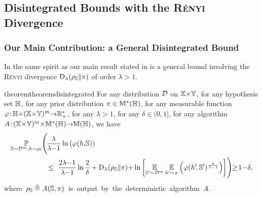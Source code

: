 \subsection{Disintegrated Bounds with the \textsc{Rényi} Divergence}

\subsubsection{Our Main Contribution: a General Disintegrated Bound}

In the same spirit as  our main result stated in  is a general bound involving the \textsc{Rényi} divergence $\operatorname{D}_{\lambda}(\rho_{\mathbb{S}}\|\pi)$ of order \mbox{$\lambda\!>\!1$}.
\begin{restatable}{theorem}{theoremdisintegrated}\label{chap:dis-pra:theorem:disintegrated} For any distribution $\mathcal{D}$ on $\mathbb{X}{\times}\mathbb{Y}$, for any hypothesis set $\mathbb{H}$, for any prior distribution $\pi\in\mathbb{M}^{*}(\mathbb{H})$, for any measurable function \mbox{$\varphi\!:\! \mathbb{H}{\times}(\mathbb{X}{\times}\mathbb{Y})^{m}{\to} \mathbb{R}_{+}^*$}, for any \mbox{$\lambda\!>\!1$}, for any $\delta\in(0,1]$, for any algorithm \mbox{$A\!:\!(\mathbb{X}{\times}\mathbb{Y})^{m}{\times}\mathbb{M}^{*}(\mathbb{H}){\to} \mathbb{M}(\mathbb{H})$}, we have
\begin{align*}
    \PP_{\S\sim\D^{\m},\h\sim \AQ}\!\Bigg(\! &\frac{\lambda}{\lambda{-}1}\ln\LP\varphi(\h,\!\S)\RP\\
    &\le  \ {\frac{2\lambda{-}1}{\lambda{-}1}}\ln\frac{2}{\delta}
 +\Renyi_{\lambda}(\AQ\|\P){+} \ln\LB\EE_{\S'{\sim}\D^{\m}}\EE_{\h'{\sim}\P}\LP\varphi(\h'\!, \S')^{\frac{\lambda}{\lambda{-}1}}\RP\RB \!\Bigg)\!\!\ge\! 1{-}\delta,
\end{align*}
\mbox{where $\rho_{\mathbb{S}} \triangleq A(\mathbb{S}, \pi)$ is output by the deterministic algorithm $A$}. 
\end{restatable}
